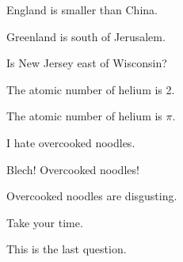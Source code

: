 \begin{exercises}
\item England is smaller than China. 
\item Greenland is south of Jerusalem. 
\item Is New Jersey east of Wisconsin? 
\item The atomic number of helium is 2. 
\item The atomic number of helium is $\pi$. 
\item I hate overcooked noodles. 
\item Blech! Overcooked noodles! 
\item Overcooked noodles are disgusting.
\item Take your time. 
\item This is the last question. 
\end{exercises}


